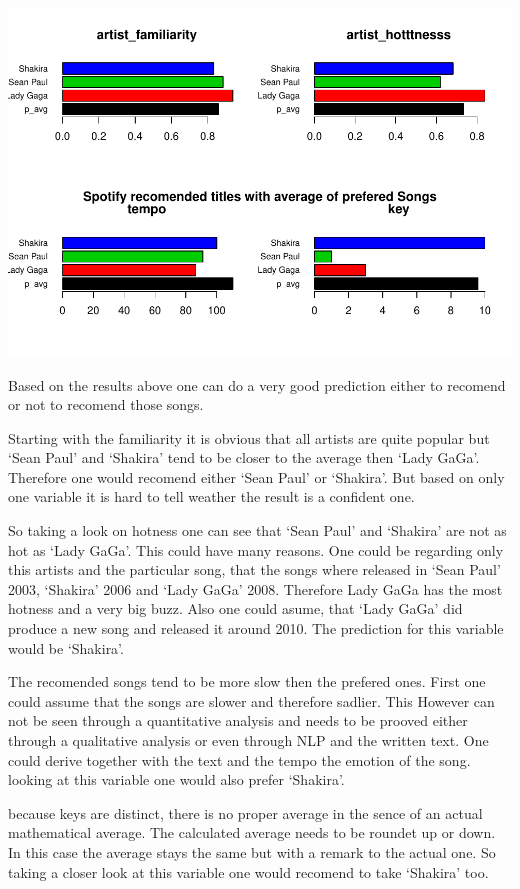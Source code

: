 \documentclass[]{article}
\begin{document}
\includegraphics{Project2_files/figure-latex/RecomendBoxplots-1.pdf}

Based on the results above one can do a very good prediction either to
recomend or not to recomend those songs.

Starting with the familiarity it is obvious that all artists are quite
popular but `Sean Paul' and `Shakira' tend to be closer to the average
then `Lady GaGa'. Therefore one would recomend either `Sean Paul' or
`Shakira'. But based on only one variable it is hard to tell weather the
result is a confident one.

So taking a look on hotness one can see that `Sean Paul' and `Shakira'
are not as hot as `Lady GaGa'. This could have many reasons. One could
be regarding only this artists and the particular song, that the songs
where released in `Sean Paul' 2003, `Shakira' 2006 and `Lady GaGa' 2008.
Therefore Lady GaGa has the most hotness and a very big buzz. Also one
could asume, that `Lady GaGa' did produce a new song and released it
around 2010. The prediction for this variable would be `Shakira'.

The recomended songs tend to be more slow then the prefered ones. First
one could assume that the songs are slower and therefore sadlier. This
However can not be seen through a quantitative analysis and needs to be
prooved either through a qualitative analysis or even through NLP and
the written text. One could derive together with the text and the tempo
the emotion of the song. looking at this variable one would also prefer
`Shakira'.

because keys are distinct, there is no proper average in the sence of an
actual mathematical average. The calculated average needs to be roundet
up or down. In this case the average stays the same but with a remark to
the actual one. So taking a closer look at this variable one would
recomend to take `Shakira' too.
\end{document}
